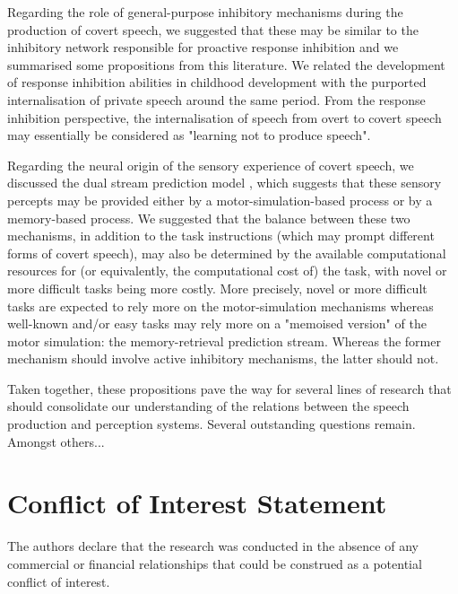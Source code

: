 \documentclass[utf8]{template/frontiersSCNS} %
\begin{document}
Regarding the role of general-purpose inhibitory mechanisms during the production of covert speech, we suggested that these may be similar to the inhibitory network responsible for proactive response inhibition and we summarised some propositions from this literature. We related the development of response inhibition abilities in childhood development with the purported internalisation of private speech around the same period. From the response inhibition perspective, the internalisation of speech from overt to covert speech may essentially be considered as "learning not to produce speech".

Regarding the neural origin of the sensory experience of covert speech, we discussed the dual stream prediction model \citep{tian_mental_2012, tian_effect_2013, tian_mental_2016}, which suggests that these sensory percepts may be provided either by a motor-simulation-based process or by a memory-based process. We suggested that the balance between these two mechanisms, in addition to the task instructions (which may prompt different forms of covert speech), may also be determined by the available computational resources for (or equivalently, the computational cost of) the task, with novel or more difficult tasks being more costly. More precisely, novel or more difficult tasks are expected to rely more on the motor-simulation mechanisms whereas well-known and/or easy tasks may rely more on a "memoised version" of the motor simulation: the memory-retrieval prediction stream. Whereas the former mechanism should involve active inhibitory mechanisms, the latter should not.

Taken together, these propositions pave the way for several lines of research that should consolidate our understanding of the relations between the speech production and perception systems. Several outstanding questions remain. Amongst others...

\section*{Conflict of Interest Statement}


The authors declare that the research was conducted in the absence of any commercial or financial relationships that could be construed as a potential conflict of interest.
\end{document}
